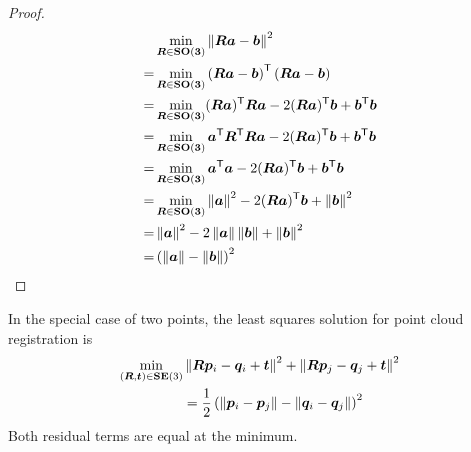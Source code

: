 \begin{proof}
\begin{equation}
	\begin{aligned}
		&\min_{\MR \in \SOthree} \normsq{\MR \va - \vb}\\
		=&\min_{\MR \in \SOthree} \left( \MR \va - \vb \right)^\transposed \left( \MR \va - \vb \right)\\
		=&\min_{\MR \in \SOthree} (\MR\va)^\transposed \MR\va - 2 (\MR \va)^\transposed \vb + \vb^\transposed \vb\\
		=&\min_{\MR \in \SOthree} \va^\transposed \MR^\transposed \MR \va - 2 (\MR \va)^\transposed \vb + \vb^\transposed \vb\\
		=&\min_{\MR \in \SOthree} \va^\transposed \va - 2 (\MR \va)^\transposed \vb + \vb^\transposed \vb\\
		=&\min_{\MR \in \SOthree} \normsq{\va} - 2 (\MR \va)^\transposed \vb  + \normsq{\vb}\\
		=& \normsq{\va} - 2 \norm{\va} \norm{\vb}  + \normsq{\vb}\\
		=& \left( \norm{\va} - \norm{\vb} \right)^2
	\end{aligned}
\end{equation}
	
\end{proof}

\begin{lemma}\label{lemma:ls-two-points}
	In the special case of two points, the least squares solution for point cloud registration is
	\begin{equation}
		\begin{aligned}
			\min_{(\MR, \vt) \in \SEthree} & \normsq{\MR \vp_i - \vq_i  + \vt} +  \normsq{\MR \vp_j - \vq_j  + \vt}\\
			&= \frac{1}{2} \left( \norm{\vp_i - \vp_j} - \norm{\vq_i - \vq_j} \right)^2
		\end{aligned}
	\end{equation}
	Both residual terms are equal at the minimum.
\end{lemma}

